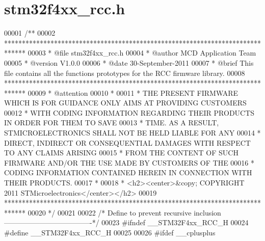 \section{stm32f4xx\+\_\+rcc.\+h}
\label{stm32f4xx__rcc_8h_source}

\begin{DoxyCode}
00001 \textcolor{comment}{/**}
00002 \textcolor{comment}{  ******************************************************************************}
00003 \textcolor{comment}{  * @file    stm32f4xx\_rcc.h}
00004 \textcolor{comment}{  * @author  MCD Application Team}
00005 \textcolor{comment}{  * @version V1.0.0}
00006 \textcolor{comment}{  * @date    30-September-2011}
00007 \textcolor{comment}{  * @brief   This file contains all the functions prototypes for the RCC firmware library.}
00008 \textcolor{comment}{  ******************************************************************************}
00009 \textcolor{comment}{  * @attention}
00010 \textcolor{comment}{  *}
00011 \textcolor{comment}{  * THE PRESENT FIRMWARE WHICH IS FOR GUIDANCE ONLY AIMS AT PROVIDING CUSTOMERS}
00012 \textcolor{comment}{  * WITH CODING INFORMATION REGARDING THEIR PRODUCTS IN ORDER FOR THEM TO SAVE}
00013 \textcolor{comment}{  * TIME. AS A RESULT, STMICROELECTRONICS SHALL NOT BE HELD LIABLE FOR ANY}
00014 \textcolor{comment}{  * DIRECT, INDIRECT OR CONSEQUENTIAL DAMAGES WITH RESPECT TO ANY CLAIMS ARISING}
00015 \textcolor{comment}{  * FROM THE CONTENT OF SUCH FIRMWARE AND/OR THE USE MADE BY CUSTOMERS OF THE}
00016 \textcolor{comment}{  * CODING INFORMATION CONTAINED HEREIN IN CONNECTION WITH THEIR PRODUCTS.}
00017 \textcolor{comment}{  *}
00018 \textcolor{comment}{  * <h2><center>&copy; COPYRIGHT 2011 STMicroelectronics</center></h2>}
00019 \textcolor{comment}{  ******************************************************************************}
00020 \textcolor{comment}{  */}
00021 
00022 \textcolor{comment}{/* Define to prevent recursive inclusion -------------------------------------*/}
00023 \textcolor{preprocessor}{#}\textcolor{preprocessor}{ifndef} \textcolor{preprocessor}{\_\_STM32F4xx\_RCC\_H}
00024 \textcolor{preprocessor}{#}\textcolor{preprocessor}{define} \textcolor{preprocessor}{\_\_STM32F4xx\_RCC\_H}
00025 
00026 \textcolor{preprocessor}{#}\textcolor{preprocessor}{ifdef} \_\_cplusplus

\end{DoxyCode}
